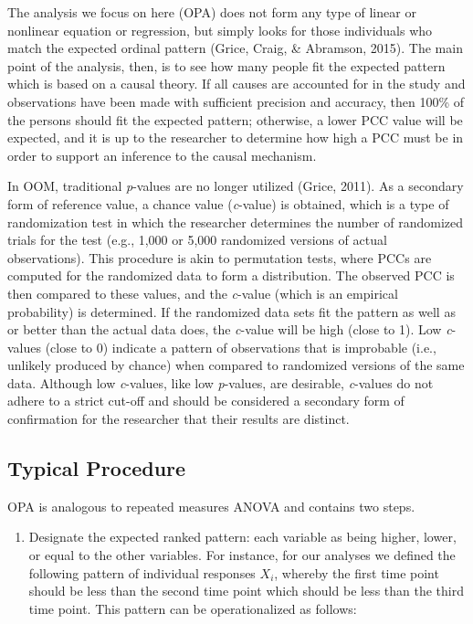 \documentclass[,man, mask]{apa6}
\providecommand{\tightlist}{%
  \setlength{\itemsep}{0pt}\setlength{\parskip}{0pt}}
\begin{document}
The analysis we focus on here (OPA) does not form any type of linear or nonlinear equation or regression, but simply looks for those individuals who match the expected ordinal pattern (Grice, Craig, \& Abramson, 2015). The main point of the analysis, then, is to see how many people fit the expected pattern which is based on a causal theory. If all causes are accounted for in the study and observations have been made with sufficient precision and accuracy, then 100\% of the persons should fit the expected pattern; otherwise, a lower PCC value will be expected, and it is up to the researcher to determine how high a PCC must be in order to support an inference to the causal mechanism.

In OOM, traditional \emph{p}-values are no longer utilized (Grice, 2011). As a secondary form of reference value, a chance value (\emph{c}-value) is obtained, which is a type of randomization test in which the researcher determines the number of randomized trials for the test (e.g., 1,000 or 5,000 randomized versions of actual observations). This procedure is akin to permutation tests, where PCCs are computed for the randomized data to form a distribution. The observed PCC is then compared to these values, and the \emph{c}-value (which is an empirical probability) is determined. If the randomized data sets fit the pattern as well as or better than the actual data does, the \emph{c}-value will be high (close to 1). Low \emph{c}-values (close to 0) indicate a pattern of observations that is improbable (i.e., unlikely produced by chance) when compared to randomized versions of the same data. Although low \emph{c}-values, like low \emph{p}-values, are desirable, \emph{c}-values do not adhere to a strict cut-off and should be considered a secondary form of confirmation for the researcher that their results are distinct.

\hypertarget{typical-procedure-2}{%
\subsection{Typical Procedure}\label{typical-procedure-2}}

OPA is analogous to repeated measures ANOVA and contains two steps.

\begin{enumerate}
\def\labelenumi{\arabic{enumi})}
\tightlist
\item
  Designate the expected ranked pattern: each variable as being higher, lower, or equal to the other variables. For instance, for our analyses we defined the following pattern of individual responses \(X_i\), whereby the first time point should be less than the second time point which should be less than the third time point. This pattern can be operationalized as follows:
\end{enumerate}
\end{document}
